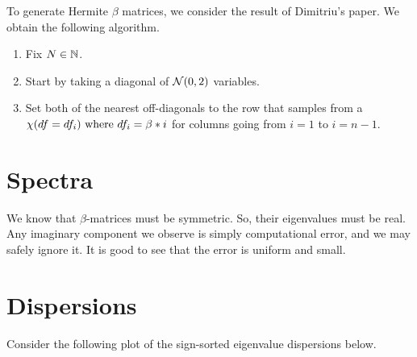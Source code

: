 To generate Hermite $\beta$ matrices, we consider the result of Dimitriu's paper. We obtain the following algorithm.

\begin{algorithm} \hfill
  \begin{enumerate}
    \item Fix $N \in \mathbb{N}$.
    \item Start by taking a diagonal of $\mathcal{N}(0,2)$ variables.
    \item Set both of the nearest off-diagonals to the row that samples from a $\chi(df = df_i) \text{ where } df_i = \beta * i$ for columns going from $i = 1$ to $i = n-1$.
  \end{enumerate}
\end{algorithm}


\newpage
\section{Spectra}

We know that $\beta$-matrices must be symmetric. So, their eigenvalues must be real. Any imaginary component we observe is simply computational error, and we may safely ignore it. It is good to see that the error is uniform and small.


\newpage
\section{Dispersions}

Consider the following plot of the sign-sorted eigenvalue dispersions below.

